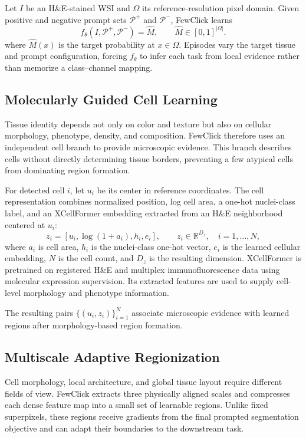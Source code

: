 \documentclass[letterpaper]{article}
\begin{document}
Let $I$ be an H\&E-stained WSI and $\Omega$ its reference-resolution pixel domain. Given positive and negative prompt sets $\mathcal{P}^{+}$ and $\mathcal{P}^{-}$, FewClick learns
\begin{equation}
f_{\theta}(I,\mathcal{P}^{+},\mathcal{P}^{-})=\widehat{M},\qquad
\widehat{M}\in[0,1]^{|\Omega|}.
\label{eq:problem}
\end{equation}
where $\widehat{M}(x)$ is the target probability at $x\in\Omega$. Episodes vary the target tissue and prompt configuration, forcing $f_\theta$ to infer each task from local evidence rather than memorize a class--channel mapping.

\subsection{Molecularly Guided Cell Learning}
Tissue identity depends not only on color and texture but also on cellular morphology, phenotype, density, and composition. FewClick therefore uses an independent cell branch to provide microscopic evidence. This branch describes cells without directly determining tissue borders, preventing a few atypical cells from dominating region formation.

For detected cell $i$, let $u_i$ be its center in reference coordinates. The cell representation combines normalized position, log cell area, a one-hot nuclei-class label, and an XCellFormer embedding extracted from an H\&E neighborhood centered at $u_i$:
\begin{equation}
z_i=[u_i,\log(1+a_i),h_i,e_i],\qquad
z_i\in\mathbb{R}^{D_z},\quad i=1,\ldots,N,
\label{eq:cell}
\end{equation}
where $a_i$ is cell area, $h_i$ is the nuclei-class one-hot vector, $e_i$ is the learned cellular embedding, $N$ is the cell count, and $D_z$ is the resulting dimension. XCellFormer is pretrained on registered H\&E and multiplex immunofluorescence data using molecular expression supervision. Its extracted features are used to supply cell-level morphology and phenotype information.

The resulting pairs $\{(u_i,z_i)\}_{i=1}^{N}$ associate microscopic evidence with learned regions after morphology-based region formation.

\subsection{Multiscale Adaptive Regionization}
Cell morphology, local architecture, and global tissue layout require different fields of view. FewClick extracts three physically aligned scales and compresses each dense feature map into a small set of learnable regions. Unlike fixed superpixels, these regions receive gradients from the final prompted segmentation objective and can adapt their boundaries to the downstream task.
\end{document}
